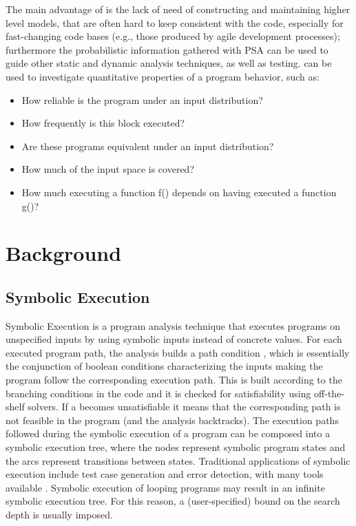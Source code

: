 \documentclass[10pt]{article}
\newcounter{list}
\begin{document}
The main advantage of \PSE{} is the lack of need of constructing and
maintaining higher level models, that are often hard to keep
consistent with the code, especially for fast-changing code bases
(e.g., those produced by agile development processes); furthermore the
probabilistic information gathered with PSA can be used to guide other
static and dynamic analysis techniques, as well as testing. \PSE{}
can be used to investigate quantitative properties of a program behavior,
such as:

\begin{itemize}
\item How reliable is the program under an input distribution?
\item How frequently is this block executed?
\item Are these programs equivalent under an input distribution?
\item How much of the input space is covered?
\item How much executing a function f() depends on having executed a function g()?
\end{itemize}

\section{Background}

\subsection{Symbolic Execution}
Symbolic Execution \cite{clarke1976system} is a program analysis
technique that executes programs on unspecified inputs by using
symbolic inputs instead of concrete values. For each executed program
path, the analysis builds a path condition \PC{}, which is essentially
the conjunction of boolean conditions characterizing the inputs making
the program follow the corresponding execution path. This \PC{} is
built according to the branching conditions in the code and it is
checked for satisfiability using off-the-shelf solvers.  If a \PC{}
becomes unsatisfiable it means that the corresponding path is not
feasible in the program (and the analysis backtracks). The execution
paths followed during the symbolic execution of a program can be
composed into a symbolic execution tree, where the nodes represent
symbolic program states and the arcs represent transitions between
states. Traditional applications of symbolic execution include test
case generation and error detection, with many tools available
\cite{cadar2011symbolic}. Symbolic execution of looping programs may
result in an infinite symbolic execution tree. For this reason,
a (user-specified) bound on the search depth is usually imposed.
\end{document}
